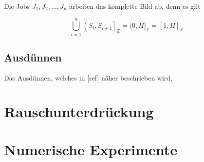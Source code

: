 \documentclass[a4paper, 11pt]{report}
\theoremstyle{definition}
\begin{document}
				Die Jobs $J_1, J_2, ..., J_n$ arbeiten das komplette Bild ab, denn es gilt

				$$ \bigcup_{i=1}^n \left(S_i, S_{i+1}\right]_\mathbb{Z} = (0,H]_\mathbb{Z} = [1,H]_\mathbb{Z}$$

			\subsection{Ausdünnen}
				Das Ausdünnen, welches in [ref] näher beschrieben wird, 

		\section{Rauschunterdrückung}


		\section{Numerische Experimente}
\end{document}
